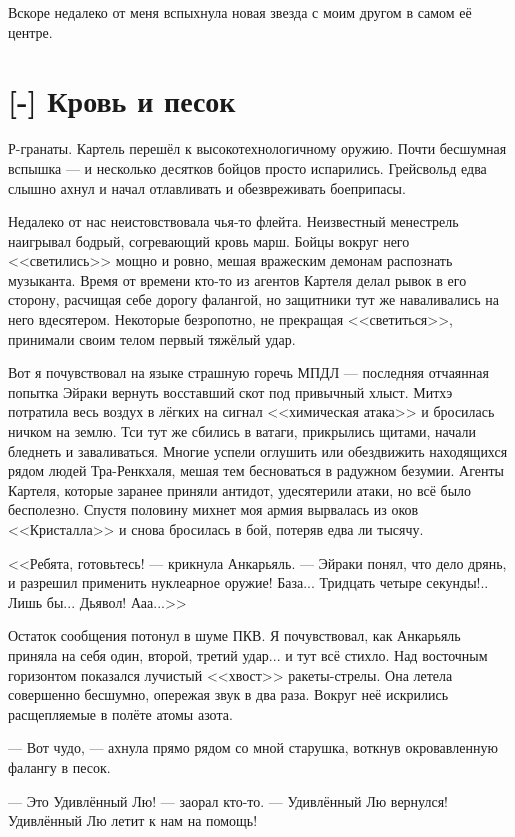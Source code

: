 Вскоре недалеко от меня вспыхнула новая звезда с моим другом в самом её центре.

\section{[-] Кровь и песок}

\textspace

Р-гранаты.
Картель перешёл к высокотехнологичному оружию.
Почти бесшумная вспышка --- и несколько десятков бойцов просто испарились.
Грейсвольд едва слышно ахнул и начал отлавливать и обезвреживать боеприпасы.

Недалеко от нас неистовствовала чья-то флейта.
Неизвестный менестрель наигрывал бодрый, согревающий кровь марш.
Бойцы вокруг него <<светились>> мощно и ровно, мешая вражеским демонам распознать музыканта.
Время от времени кто-то из агентов Картеля делал рывок в его сторону, расчищая себе дорогу фалангой, но защитники тут же наваливались на него вдесятером.
Некоторые безропотно, не прекращая <<светиться>>, принимали своим телом первый тяжёлый удар.

Вот я почувствовал на языке страшную горечь МПДЛ --- последняя отчаянная попытка Эйраки вернуть восставший скот под привычный хлыст.
Митхэ потратила весь воздух в лёгких на сигнал <<химическая атака>> и бросилась ничком на землю.
Тси тут же сбились в ватаги, прикрылись щитами, начали бледнеть и заваливаться.
Многие успели оглушить или обездвижить находящихся рядом людей Тра-Ренкхаля, мешая тем бесноваться в радужном безумии.
Агенты Картеля, которые заранее приняли антидот, удесятерили атаки, но всё было бесполезно.
Спустя половину михнет моя армия вырвалась из оков <<Кристалла>> и снова бросилась в бой, потеряв едва ли тысячу.

<<Ребята, готовьтесь! --- крикнула Анкарьяль.
--- Эйраки понял, что дело дрянь, и разрешил применить нуклеарное оружие!
База... Тридцать четыре секунды!.. Лишь бы... Дьявол! Ааа...>>

Остаток сообщения потонул в шуме ПКВ.
Я почувствовал, как Анкарьяль приняла на себя один, второй, третий удар... и тут всё стихло.
Над восточным горизонтом показался лучистый <<хвост>> ракеты-стрелы.
Она летела совершенно бесшумно, опережая звук в два раза.
Вокруг неё искрились расщепляемые в полёте атомы азота.

--- Вот чудо, --- ахнула прямо рядом со мной старушка, воткнув окровавленную фалангу в песок.

--- Это Удивлённый Лю! --- заорал кто-то.
--- Удивлённый Лю вернулся!
Удивлённый Лю летит к нам на помощь!

